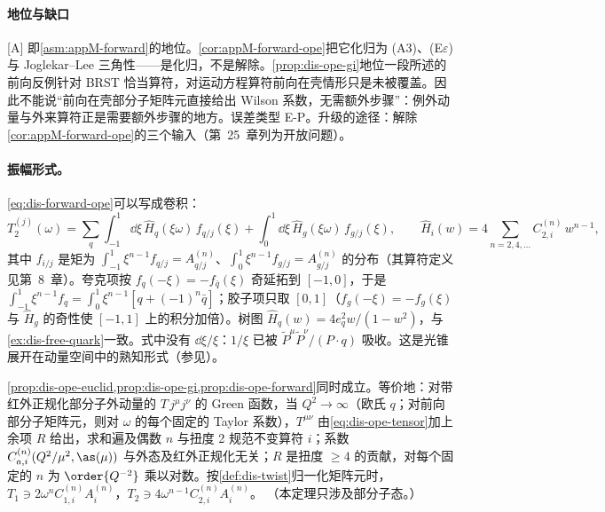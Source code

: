 \paragraph{地位与缺口}
[A] 即\cref{asm:appM-forward}的地位。\cref{cor:appM-forward-ope}把它化归为 (A3)、(E$\varepsilon$) 与 Joglekar--Lee 三角性——是化归，不是解除。\cref{prop:dis-ope-gi}地位一段所述的前向反例针对 BRST 恰当算符，对运动方程算符前向在壳情形只是未被覆盖。因此不能说“前向在壳部分子矩阵元直接给出 Wilson 系数，无需额外步骤”：例外动量与外来算符正是需要额外步骤的地方。误差类型 E-P。升级的途径：解除\cref{cor:appM-forward-ope}的三个输入（第~25~章列为开放问题）。

\paragraph{振幅形式。}\cref{eq:dis-forward-ope}可以写成卷积：
\begin{equation}\label{eq:dis-amplitude-form}
T_2^{(j)}(\omega)=\sum_q\int_{-1}^1\dd\xi\,\hat H_q(\xi\omega)\,f_{q/j}(\xi)+\int_0^1\dd\xi\,\hat H_g(\xi\omega)\,f_{g/j}(\xi),\qquad \hat H_i(w)=4\sum_{n=2,4,\dots}C^{(n)}_{2,i}\,w^{n-1},
\end{equation}
其中 $f_{i/j}$ 是矩为 $\int_{-1}^1\xi^{n-1}f_{q/j}=A^{(n)}_{q/j}$、$\int_0^1\xi^{n-1}f_{g/j}=A^{(n)}_{g/j}$ 的分布（其算符定义见第~8~章）。夸克项按 $f_q(-\xi)=-f_{\bar q}(\xi)$ 奇延拓到 $[-1,0]$，于是 $\int_{-1}^1\xi^{n-1}f_q=\int_0^1\xi^{n-1}[q+(-1)^n\bar q]$；胶子项只取 $[0,1]$（$f_g(-\xi)=-f_g(\xi)$ 与 $\hat H_g$ 的奇性使 $[-1,1]$ 上的积分加倍）。树图 $\hat H_q(w)=4e_q^2w/(1-w^2)$，与\cref{ex:dis-free-quark}一致。式中没有 $\dd\xi/\xi$：$1/\xi$ 已被 $\tilde P^\mu\tilde P^\nu/(P\cdot q)$ 吸收。这是光锥展开在动量空间中的熟知形式（参见\cite{ChristHasslacherMueller1972,BrandtPreparata1971}）。

\begin{theorem}\label{thm:dis-ope}
\cref{prop:dis-ope-euclid,prop:dis-ope-gi,prop:dis-ope-forward}同时成立。等价地：对带红外正规化部分子外动量的 $T\,j^\mu j^\nu$ 的 Green 函数，当 $Q^2\to\infty$（欧氏 $q$；对前向部分子矩阵元，则对 $\omega$ 的每个固定的 Taylor 系数），$T^{\mu\nu}$ 由\cref{eq:dis-ope-tensor}加上余项 $R$ 给出，求和遍及偶数 $n$ 与扭度 2 规范不变算符 $i$；系数 $C^{(n)}_{a,i}(Q^2/\mu^2,\as(\mu))$ 与外态及红外正规化无关；$R$ 是扭度 $\ge4$ 的贡献，对每个固定的 $n$ 为 $\order{Q^{-2}}$ 乘以对数。按\cref{def:dis-twist}归一化矩阵元时，$T_1\ni2\omega^nC^{(n)}_{1,i}A^{(n)}_i$，$T_2\ni4\omega^{n-1}C^{(n)}_{2,i}A^{(n)}_i$。%
（本定理只涉及部分子态。）
\end{theorem}

